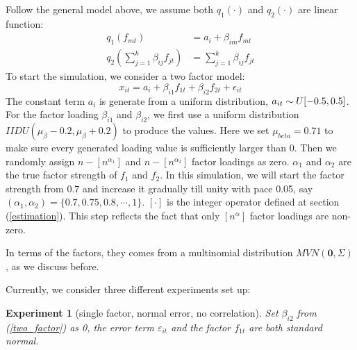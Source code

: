 \documentclass[12pt]{article}
\newtheorem{experiment}{Experiment}
\begin{document}
Follow the general model above, we assume both $q_1(\cdot)$ and $q_2(\cdot)$ are linear function:
\begin{align*}
q_1({f_{mt}}) &= a_{i} +\beta_{im} f_{mt}\\
q_2(\sum_{j = 1}^{k}\beta_{ij}f_{jt}) &=\sum_{j = 1}^{k}\beta_{ij}f_{jt}
\end{align*}
To start the simulation, we consider a two factor model:
\[    x_{it} = a_{i} + \beta_{i1}f_{1t} + \beta_{i2}f_{2t}+\epsilon_{it} \tag{6} \label{two_factor}   \]
The constant term $a_{i}$ is generate from a uniform distribution, $a_{it} \sim \mathnormal{U}[-0.5,0.5]$.
For the factor loading $\beta_{i1}$ and $\beta_{i2}$, we first use a uniform distribution $IIDU(\mu_{\beta} - 0.2, \mu_{\beta}+0.2)$ to produce the values.
Here we set $\mu_{beta}=0.71$ to make sure every generated loading value is sufficiently larger than 0.
Then we randomly assign $n - [n^{\alpha_{1}}]$ and $n - [n^{\alpha_{2}}]$ factor loadings as zero.
$\alpha_1$ and $\alpha_2$ are the true factor strength of $f_1$ and $f_2$. 
In this simulation, we will start the factor strength from 0.7 and increase it gradually till unity with pace 0.05, say $(\alpha_{1}, \alpha_{2}) = \{0.7, 0.75,0.8,\cdots,1\}$.
 $[\cdot]$ is the integer operator defined at section (\ref{estimation}).
This step reflects the fact that only $[n^\alpha]$ factor loadings are non-zero.

In terms of the factors, they comes from a multinomial distribution $MVN(\mathbf{0}, \Sigma) $, as we discuss before.

Currently, we consider three different experiments set up:

\begin{experiment}[single factor, normal error, no correlation]
Set $\beta_{i2}$ from (\ref{two_factor}) as 0, the error term $\varepsilon_{it}$ and the factor $f_{1t}$ are both standard normal.
\end{experiment}
\end{document}
